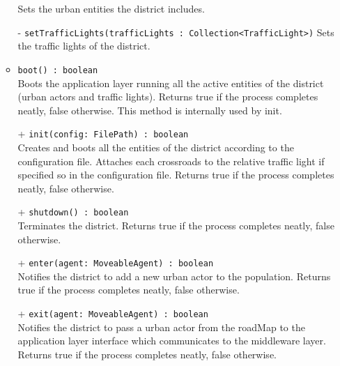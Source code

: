 \begin{itemize}
\begin{itemize}
    Sets the urban entities the district includes.
    \item[-] \texttt{setTrafficLights(trafficLights : Collection<TrafficLight>)}
    Sets the traffic lights of the district.
    \item \texttt{boot() : boolean} \\
    Boots the application layer running all the active entities of the 
    district (urban actors and traffic lights).
    Returns true if the process completes neatly, false otherwise. 
    This method is internally used by init.
    \item[+] \texttt{init(config: FilePath) : boolean} \\
    Creates and boots all the entities of the district according to the 
    configuration file. Attaches each crossroads to the relative traffic light
    if specified so in the configuration file. 
    Returns true if the process completes neatly, false otherwise.
    \item[+] \texttt{shutdown() : boolean} \\
    Terminates the district. Returns true if the process completes neatly,
    false otherwise.
    \item[+] \texttt{enter(agent: MoveableAgent) : boolean} \\
    Notifies the district to add a new urban actor to the population.
    Returns true if the process completes neatly, false otherwise.
    \item[+] \texttt{exit(agent: MoveableAgent) : boolean} \\
    Notifies the district to pass a urban actor from the roadMap to the 
    application layer interface which communicates to the middleware layer.
    Returns true if the process completes neatly, false otherwise.
  \end{itemize}
\end{itemize} 
